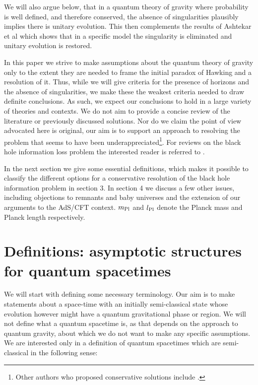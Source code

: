 \documentclass[12pt]{article}
\begin{document}
We will also argue below, that in a quantum theory of gravity where probability is well defined, and therefore conserved,
the absence of singularities plausibly implies there is unitary evolution. This then complements the results of Ashtekar et al \cite{Ashtekar:2008jd} which shows that in a specific model the singularity is eliminated and unitary evolution is restored.  


In this paper we strive to make assumptions about the quantum theory of gravity only to the extent they are needed to frame
the initial paradox of Hawking and a resolution of it.  Thus, while we will give criteria for the presence of horizons and the absence of singularities, we make these the weakest criteria needed to draw definite conclusions.  As such, we expect  our conclusions to hold
in a large variety of theories and contexts. We do not aim to provide a concise review of the literature or previously
discussed solutions. Nor do we claim the point of view advocated here is original, our aim is to support an approach to resolving  the problem that seems to have been underappreciated\footnote{Other authors who proposed conservative solutions
include \cite{conservative,Hsu:2006pe}.}.  For reviews on the black hole information loss problem the interested reader is referred to \cite{Page,Preskill}.

In the next section we give some essential definitions, which makes it possible to classify the different options for a conservative
resolution of the black hole information problem in section 3.  In section 4 we discuss a few other issues, including objections to
remnants and baby universes and the extension of our arguments to the AdS/CFT context. $m_{\rm{Pl}}$ and $l_{{\rm Pl}}$ denote the
Planck mass and Planck length respectively.  


\section{Definitions: asymptotic structures for quantum spacetimes}


We will start with defining some necessary terminology. Our aim is to make statements about a space-time with an initially 
semi-classical state whose evolution however might have a quantum gravitational phase or region. We will not define what a quantum 
spacetime is, as that depends on the approach to quantum gravity, about which we do not want to make any specific
assumptions. We are interested only
in a definition of quantum spacetimes which are semi-classical in the following sense:
\end{document}
